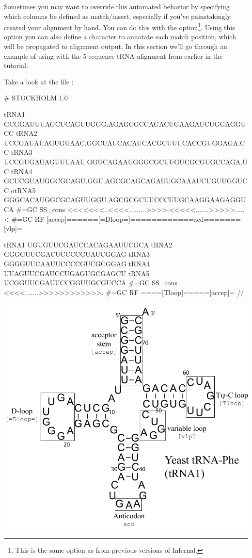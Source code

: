 Sometimes you may want to override this automated behavior by
specifying which columns be defined as match/insert, especially if
you've painstakingly created your alignment by hand. You can do this
with the  option\footnote{This is the same option as
   from previous versions of Infernal.}. Using this option
you can also define a character to annotate each match position, which
will be propagated to alignment output. In this section we'll go
through an example of using  with the 5 sequence tRNA
alignment from earlier in the tutorial.

Take a look at the file :

\vspace{1em}
\begin{minipage}{4.0in}
\begin{sreoutput}[xleftmargin=0em]
# STOCKHOLM 1.0

tRNA1             GCGGAUUUAGCUCAGUUGGG.AGAGCGCCAGACUGAAGAUCUGGAGGUCC
tRNA2             UCCGAUAUAGUGUAAC.GGCUAUCACAUCACGCUUUCACCGUGGAGA.CC
tRNA3             UCCGUGAUAGUUUAAU.GGUCAGAAUGGGCGCUUGUCGCGUGCCAGA.UC
tRNA4             GCUCGUAUGGCGCAGU.GGU.AGCGCAGCAGAUUGCAAAUCUGUUGGUCC
otRNA5             GGGCACAUGGCGCAGUUGGU.AGCGCGCUUCCCUUGCAAGGAAGAGGUCA
#=GC SS_cons      <<<<<<<..<<<<.........>>>>.<<<<<.......>>>>>.....<
#=GC RF           [accep]======[=Dloop=]============acd=======[vlp]=

tRNA1             UGUGUUCGAUCCACAGAAUUCGCA
tRNA2             GGGGUUCGACUCCCCGUAUCGGAG
tRNA3             GGGGUUCAAUUCCCCGUCGCGGAG
tRNA4             UUAGUUCGAUCCUGAGUGCGAGCU
tRNA5             UCGGUUCGAUUCCGGUUGCGUCCA
#=GC SS_cons      <<<<.......>>>>>>>>>>>>.
#=GC RF           ====[Tloop]=====[accep]=
//
\end{sreoutput}
\end{minipage}
\begin{minipage}{1.5in}
\includegraphics[scale=0.4]{Figures/trna1-DF6280-hand}
\end{minipage}
\vspace{1em}

